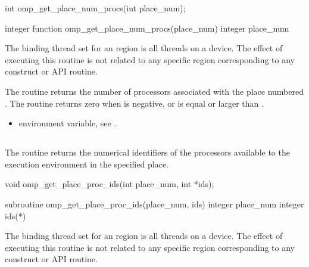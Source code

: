 \format
\ccppspecificstart
\begin{boxedcode}
int omp\_get\_place\_num\_procs(int place\_num);
\end{boxedcode}
\ccppspecificend

\fortranspecificstart
\begin{boxedcode}
integer function omp\_get\_place\_num\_procs(place\_num)
integer place\_num
\end{boxedcode}
\fortranspecificend

\binding
The binding thread set for an   region is all threads on a device. The effect of executing this routine is not related to any specific region corresponding to any construct or API routine.

\effect
The  routine returns the number of processors associated with the place numbered . The routine returns zero when  is negative, or is equal or larger than . 

\crossreferences
\begin{itemize}
\item {} environment variable, see 
.
\end{itemize}




\subsection{}
\label{subsec:omp_get_place_proc_ids}

\summary
The  routine returns the numerical identifiers of the processors available to the execution environment in the specified place.

\format
\ccppspecificstart
\begin{boxedcode}
void omp\_get\_place\_proc\_ids(int place\_num, int *ids);
\end{boxedcode}
\ccppspecificend

\fortranspecificstart
\begin{boxedcode}
subroutine omp\_get\_place\_proc\_ids(place_num, ids)
integer place\_num
integer ids(*)
\end{boxedcode}
\fortranspecificend

\binding
The binding thread set for an  region is all threads on a device. The effect of executing this routine is not related to any specific region corresponding to any construct or API routine.

